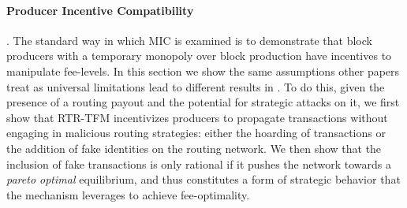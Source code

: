 \paragraph{Producer Incentive Compatibility}. The standard way in which MIC is examined is to demonstrate that block producers with a temporary monopoly over block production have incentives to manipulate fee-levels. In this section we show the same assumptions other papers treat as universal limitations lead to different results in \ourTFM. To do this, given the presence of a routing payout and the potential for strategic attacks on it, we first show that RTR-TFM incentivizes producers to propagate transactions without engaging in malicious routing strategies: either the hoarding of transactions or the addition of fake identities on the routing network. We then show that the inclusion of fake transactions is only rational if it pushes the network towards a \textit{pareto optimal} equilibrium, and thus constitutes a form of strategic behavior that the mechanism leverages to achieve fee-optimality.

